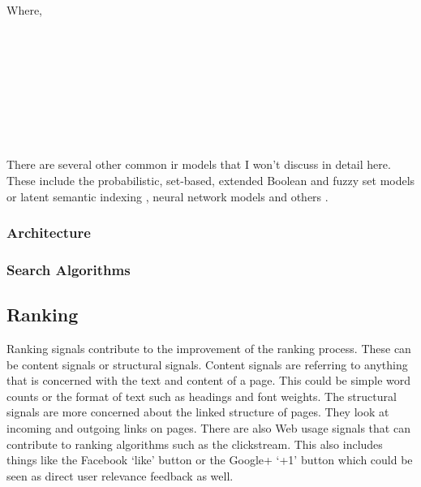 Where,\\
 \\
 \\
 \\
 \\
 \\
 \\
 \\
 \\
 

There are several other common \ac{ir} models that I won't discuss in detail here. These include the probabilistic, set-based, extended Boolean and fuzzy set {\sloppy \autocite{Miyamoto2010, Miyamoto1988, Srinivasan2001, Widyantoro2001, Miyamoto1986}} models or latent semantic indexing \autocite{Deerwester1990}, neural network models and others \autocite{Macdonald2009, Schuetze1998, Schuetze}.



\subsubsection*{Architecture}





\subsubsection*{Search Algorithms}


\subsection{Ranking}

Ranking signals contribute to the improvement of the ranking process. These can be content signals or structural signals. Content signals are referring to anything that is concerned with the text and content of a page. This could be simple word counts or the format of text such as headings and font weights. The structural signals are more concerned about the linked structure of pages. They look at incoming and outgoing links on pages. There are also Web usage signals that can contribute to ranking algorithms such as the clickstream.  This also includes things like the Facebook `like' button or the Google+ `+1' button which could be seen as direct user relevance feedback as well.

